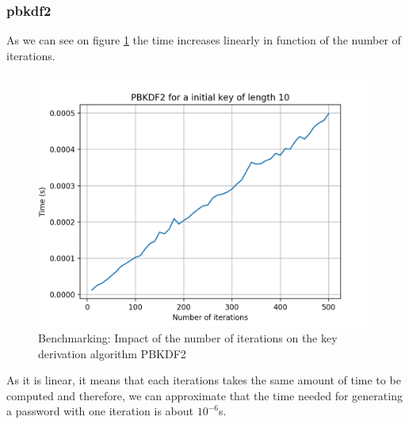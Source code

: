 \documentclass{eplmastersthesis}
\begin{document}
\subsubsection{\gls{pbkdf2}}
As we can see on figure \ref{benchmarking:timePBKDF2} the time increases linearly in function of the number of iterations.
\begin{figure}[h!]
\begin{center}
	\includegraphics[scale=0.6]{res/TimePBKDF2}
	\caption{Benchmarking: Impact of the number of iterations on the key derivation algorithm PBKDF2}
	\label{benchmarking:timePBKDF2}
\end{center}
\end{figure}
As it is linear, it means that each iterations takes the same amount of time to be computed and therefore, we can approximate that the time needed for generating a password with one iteration is about $10^{-6}$s.
\end{document}
